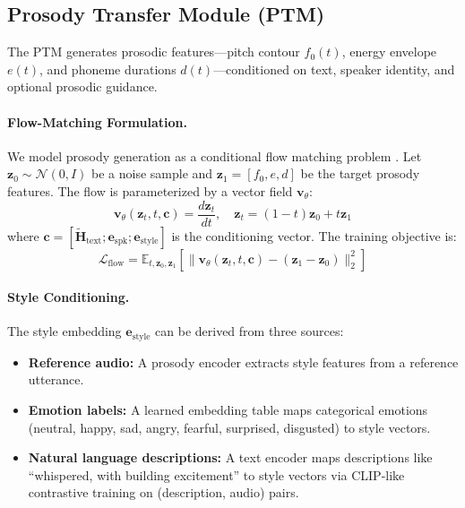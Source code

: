 \documentclass[11pt,a4paper]{article}
\begin{document}
\subsection{Prosody Transfer Module (PTM)}
\label{sec:ptm}

The PTM generates prosodic features---pitch contour $f_0(t)$, energy envelope $e(t)$, and phoneme durations $d(t)$---conditioned on text, speaker identity, and optional prosodic guidance.

\paragraph{Flow-Matching Formulation.} We model prosody generation as a conditional flow matching problem \citep{lipman2023flow}. Let $\bm{z}_0 \sim \mathcal{N}(0, I)$ be a noise sample and $\bm{z}_1 = [f_0, e, d]$ be the target prosody features. The flow is parameterized by a vector field $\bm{v}_\theta$:
\begin{equation}
    \bm{v}_\theta(\bm{z}_t, t, \bm{c}) = \frac{d\bm{z}_t}{dt}, \quad \bm{z}_t = (1-t)\bm{z}_0 + t\bm{z}_1
\end{equation}
where $\bm{c} = [\tilde{\bm{H}}_{\text{text}}; \bm{e}_{\text{spk}}; \bm{e}_{\text{style}}]$ is the conditioning vector. The training objective is:
\begin{equation}
    \mathcal{L}_{\text{flow}} = \mathbb{E}_{t, \bm{z}_0, \bm{z}_1} \left[\|\bm{v}_\theta(\bm{z}_t, t, \bm{c}) - (\bm{z}_1 - \bm{z}_0)\|_2^2\right]
\end{equation}

\paragraph{Style Conditioning.} The style embedding $\bm{e}_{\text{style}}$ can be derived from three sources:
\begin{itemize}
    \item \textbf{Reference audio:} A prosody encoder extracts style features from a reference utterance.
    \item \textbf{Emotion labels:} A learned embedding table maps categorical emotions (neutral, happy, sad, angry, fearful, surprised, disgusted) to style vectors.
    \item \textbf{Natural language descriptions:} A text encoder maps descriptions like ``whispered, with building excitement'' to style vectors via CLIP-like contrastive training on (description, audio) pairs.
\end{itemize}
\end{document}
